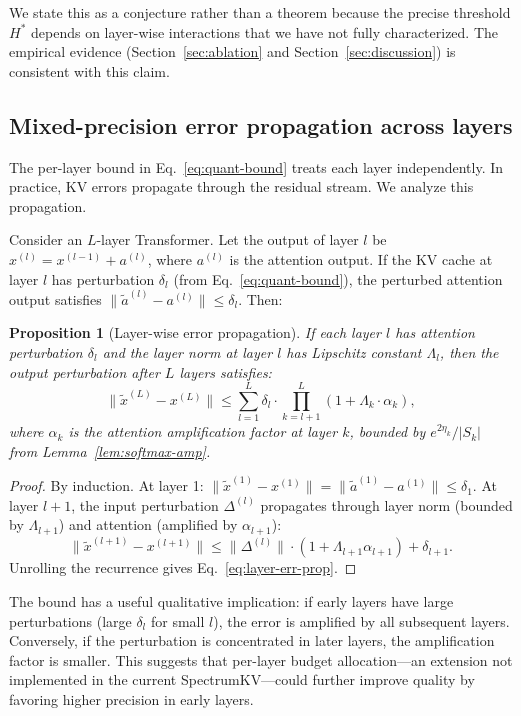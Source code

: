 \documentclass[11pt]{article}
\newcommand{\method}{SpectrumKV}
\theoremstyle{plain}
\newtheorem{proposition}{Proposition}
\theoremstyle{definition}
\begin{document}
We state this as a conjecture rather than a theorem because the precise threshold $H^*$ depends on layer-wise interactions that we have not fully characterized.  The empirical evidence (Section~\ref{sec:ablation} and Section~\ref{sec:discussion}) is consistent with this claim.

\subsection{Mixed-precision error propagation across layers}
\label{sec:layer-error}

The per-layer bound in Eq.~\eqref{eq:quant-bound} treats each layer independently.  In practice, KV errors propagate through the residual stream.  We analyze this propagation.

Consider an $L$-layer Transformer.  Let the output of layer $l$ be $x^{(l)} = x^{(l-1)} + a^{(l)}$, where $a^{(l)}$ is the attention output.  If the KV cache at layer $l$ has perturbation $\delta_l$ (from Eq.~\eqref{eq:quant-bound}), the perturbed attention output satisfies $\|\tilde a^{(l)} - a^{(l)}\| \le \delta_l$.  Then:

\begin{proposition}[Layer-wise error propagation]
\label{prop:layer-err}
If each layer $l$ has attention perturbation $\delta_l$ and the layer norm at layer $l$ has Lipschitz constant $\Lambda_l$, then the output perturbation after $L$ layers satisfies:
\begin{equation}
  \|\tilde x^{(L)} - x^{(L)}\| \le \sum_{l=1}^{L} \delta_l \cdot \prod_{k=l+1}^{L} (1 + \Lambda_k \cdot \alpha_k),
  \label{eq:layer-err-prop}
\end{equation}
where $\alpha_k$ is the attention amplification factor at layer $k$, bounded by $e^{2\eta_k}/|S_k|$ from Lemma~\ref{lem:softmax-amp}.
\end{proposition}
\begin{proof}
By induction.  At layer 1: $\|\tilde x^{(1)} - x^{(1)}\| = \|\tilde a^{(1)} - a^{(1)}\| \le \delta_1$.  At layer $l+1$, the input perturbation $\Delta^{(l)}$ propagates through layer norm (bounded by $\Lambda_{l+1}$) and attention (amplified by $\alpha_{l+1}$):
\[
  \|\tilde x^{(l+1)} - x^{(l+1)}\| \le \|\Delta^{(l)}\| \cdot (1 + \Lambda_{l+1} \alpha_{l+1}) + \delta_{l+1}.
\]
Unrolling the recurrence gives Eq.~\eqref{eq:layer-err-prop}.
\end{proof}

The bound has a useful qualitative implication: if early layers have large perturbations (large $\delta_l$ for small $l$), the error is amplified by all subsequent layers.  Conversely, if the perturbation is concentrated in later layers, the amplification factor is smaller.  This suggests that per-layer budget allocation---an extension not implemented in the current \method{}---could further improve quality by favoring higher precision in early layers.
\end{document}
